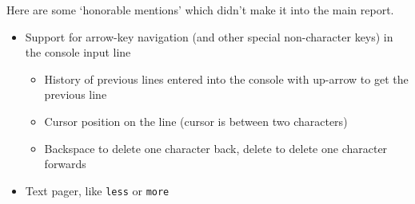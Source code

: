 \documentclass{article}
\begin{document}
Here are some `honorable mentions' which didn't make it into the main report.

\begin{itemize}
    \item Support for arrow-key navigation (and other special non-character
        keys) in the console input line
        \begin{itemize}
            \item History of previous lines entered into the console with
                up-arrow to get the previous line
            \item Cursor position on the line (cursor is between two
                characters)
            \item Backspace to delete one character back, delete to delete one
                character forwards
        \end{itemize}
    \item Text pager, like \texttt{less} or \texttt{more}
\end{itemize}


\clearpage
\printglossaries
\end{document}
